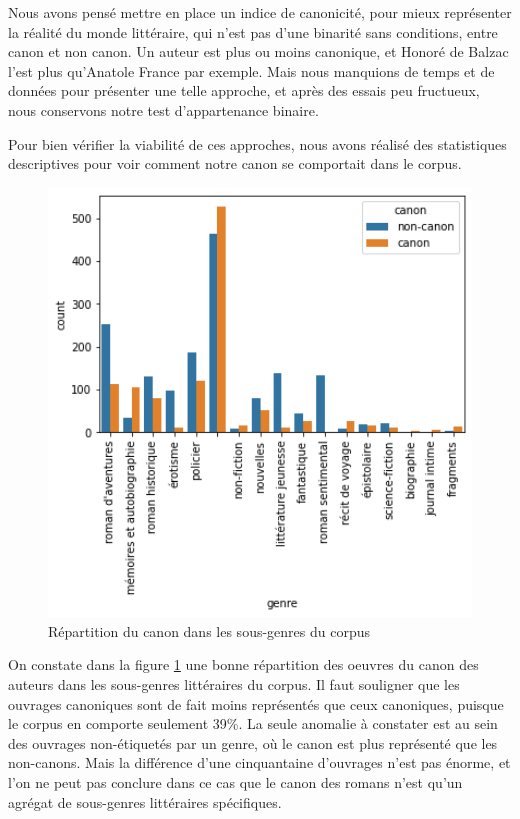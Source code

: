 Nous avons pensé mettre en place un indice de canonicité, pour mieux représenter la réalité du monde littéraire, qui n'est pas d'une binarité sans conditions, entre canon et non canon. Un auteur est plus ou moins canonique, et Honoré de Balzac l'est plus qu'Anatole France par exemple. Mais nous manquions de temps et de données pour présenter une telle approche, et après des essais peu fructueux, nous conservons notre test d'appartenance binaire.

Pour bien vérifier la viabilité de ces approches, nous avons réalisé des statistiques descriptives pour voir comment notre canon se comportait dans le corpus. 

\bigskip
\begin{figure}[!ht]
    \centering
    \includegraphics[width=15cm]{img/03_genres_corpus_canon.png}
    \caption{Répartition du canon dans les sous-genres du corpus}
    \label{genre_corpus_canon}
\end{figure}

On constate dans la figure \ref{genre_corpus_canon} une bonne répartition des oeuvres du canon des auteurs dans les sous-genres littéraires du corpus. Il faut souligner que les ouvrages canoniques sont de fait moins représentés que ceux canoniques, puisque le corpus en comporte seulement 39\%. La seule anomalie à constater est au sein des ouvrages non-étiquetés par un genre, où le canon est plus représenté que les non-canons. Mais la différence d'une cinquantaine d'ouvrages n'est pas énorme, et l'on ne peut pas conclure dans ce cas que le canon des romans n'est qu'un agrégat de sous-genres littéraires spécifiques.

